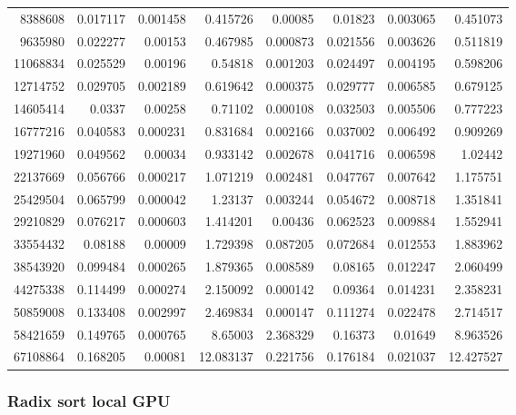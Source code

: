 \begin{longtable}{r r r r r r r r}
8388608 & 0.017117 & 0.001458 & 0.415726 & 0.00085 & 0.01823 & 0.003065 & 0.451073 \\
9635980 & 0.022277 & 0.00153 & 0.467985 & 0.000873 & 0.021556 & 0.003626 & 0.511819 \\
11068834 & 0.025529 & 0.00196 & 0.54818 & 0.001203 & 0.024497 & 0.004195 & 0.598206 \\
12714752 & 0.029705 & 0.002189 & 0.619642 & 0.000375 & 0.029777 & 0.006585 & 0.679125 \\
14605414 & 0.0337 & 0.00258 & 0.71102 & 0.000108 & 0.032503 & 0.005506 & 0.777223 \\
16777216 & 0.040583 & 0.000231 & 0.831684 & 0.002166 & 0.037002 & 0.006492 & 0.909269 \\
19271960 & 0.049562 & 0.00034 & 0.933142 & 0.002678 & 0.041716 & 0.006598 & 1.02442 \\
22137669 & 0.056766 & 0.000217 & 1.071219 & 0.002481 & 0.047767 & 0.007642 & 1.175751 \\
25429504 & 0.065799 & 0.000042 & 1.23137 & 0.003244 & 0.054672 & 0.008718 & 1.351841 \\
29210829 & 0.076217 & 0.000603 & 1.414201 & 0.00436 & 0.062523 & 0.009884 & 1.552941 \\
33554432 & 0.08188 & 0.00009 & 1.729398 & 0.087205 & 0.072684 & 0.012553 & 1.883962 \\
38543920 & 0.099484 & 0.000265 & 1.879365 & 0.008589 & 0.08165 & 0.012247 & 2.060499 \\
44275338 & 0.114499 & 0.000274 & 2.150092 & 0.000142 & 0.09364 & 0.014231 & 2.358231 \\
50859008 & 0.133408 & 0.002997 & 2.469834 & 0.000147 & 0.111274 & 0.022478 & 2.714517 \\
58421659 & 0.149765 & 0.000765 & 8.65003 & 2.368329 & 0.16373 & 0.01649 & 8.963526 \\
67108864 & 0.168205 & 0.00081 & 12.083137 & 0.221756 & 0.176184 & 0.021037 & 12.427527 \\
\end{longtable}

\subsubsection{Radix sort local GPU}


